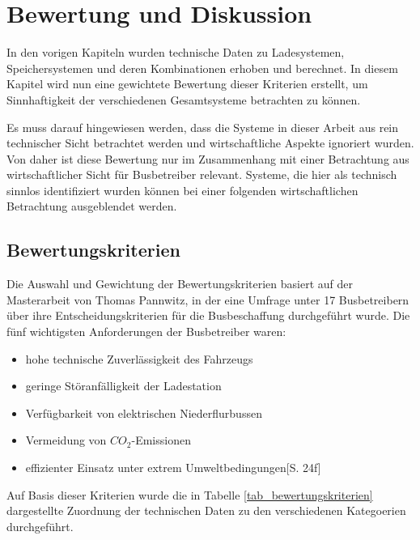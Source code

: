 \chapter{Bewertung und Diskussion} %
In den vorigen Kapiteln wurden technische Daten zu Ladesystemen, Speichersystemen und deren Kombinationen erhoben und berechnet. In diesem Kapitel wird nun eine gewichtete Bewertung dieser Kriterien erstellt, um Sinnhaftigkeit der verschiedenen Gesamtsysteme betrachten zu können.

Es muss darauf hingewiesen werden, dass die Systeme in dieser Arbeit aus rein technischer Sicht betrachtet werden und wirtschaftliche Aspekte ignoriert wurden. Von daher ist diese Bewertung nur im Zusammenhang mit einer Betrachtung aus wirtschaftlicher Sicht für Busbetreiber relevant. Systeme, die hier als technisch sinnlos identifiziert wurden können bei einer folgenden wirtschaftlichen Betrachtung ausgeblendet werden.

\section{Bewertungskriterien}
Die Auswahl und Gewichtung der Bewertungskriterien basiert auf der Masterarbeit von Thomas Pannwitz, in der eine Umfrage unter 17 Busbetreibern über ihre Entscheidungskriterien für die Busbeschaffung durchgeführt wurde. Die fünf wichtigsten Anforderungen der Busbetreiber waren:
\begin{itemize}
	\item hohe technische Zuverlässigkeit des Fahrzeugs
	\item geringe Störanfälligkeit der Ladestation
	\item Verfügbarkeit von elektrischen Niederflurbussen
	\item Vermeidung von $CO_2$-Emissionen
	\item effizienter Einsatz unter extrem Umweltbedingungen\cite{pannwitz2014}[S. 24f]
\end{itemize}

Auf Basis dieser Kriterien wurde die in Tabelle \ref{tab_bewertungskriterien} dargestellte Zuordnung der technischen Daten zu den verschiedenen Kategoerien durchgeführt.



